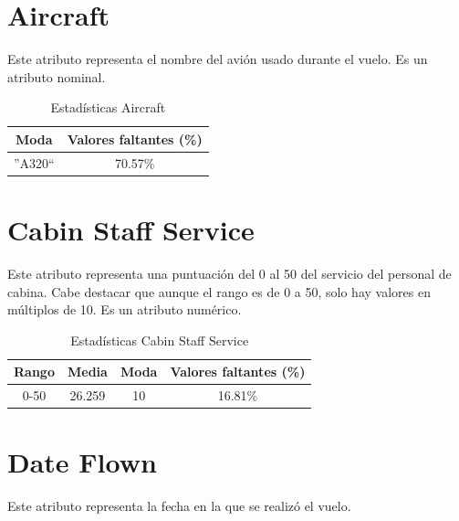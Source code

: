 \documentclass[12pt]{report} %
\begin{document}
    \section{Aircraft}

    Este atributo representa el nombre del avión usado durante el vuelo. Es un
    atributo nominal.

    \begin{table}[H]
        \begin{center}
            \begin{tabular}{ @{}cc@{} }
                \toprule
                Moda & Valores faltantes (\%) \\
                \midrule
                ''A320`` & 70.57\% \\
                \bottomrule
            \end{tabular}
            \caption{Estadísticas Aircraft}
        \end{center}
    \end{table}

    \section{Cabin Staff Service}

    Este atributo representa una puntuación del 0 al 50 del servicio del personal de cabina.
    Cabe destacar que aunque el rango es de 0 a 50, solo hay valores en múltiplos de 10.
    Es un atributo numérico.

    \begin{table}[H]
        \begin{center}
            \begin{tabular}{ @{}cccc@{} }
                \toprule
                Rango & Media & Moda & Valores faltantes (\%) \\
                \midrule
                0-50 & 26.259 & 10 & 16.81\% \\
                \bottomrule
            \end{tabular}
            \caption{Estadísticas Cabin Staff Service}
        \end{center}
    \end{table}

    \section{Date Flown}

    Este atributo representa la fecha en la que se realizó el vuelo.
\end{document}
